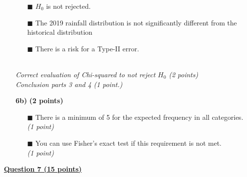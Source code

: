\begin{itemize}
\begin{itemize}
        \item[$\blacksquare$] $H_0$ is not rejected.
        \item[$\blacksquare$] The 2019 rainfall distribution is not significantly different from the historical distribution 
        \item[$\blacksquare$] There is a risk for a Type-II error.
    \end{itemize} \\
    \textit{Correct evaluation of Chi-squared to not reject $H_0$ (2 points) \\ Conclusion parts 3 and 4 (1 point.)} \\
\item[\textbf{6b)}] \textbf{(2 points)} \\
    \begin{itemize}
        \item[$\blacksquare$] There is a minimum of 5 for the expected frequency in all categories.\\ \textit{(1 point)}
        \item[$\blacksquare$] You can use Fisher’s exact test if this requirement is not met.\\ \textit{(1 point)}
        \end{itemize}
\end{itemize}

\underline{\textbf{Question 7 (15 points)}} \\

